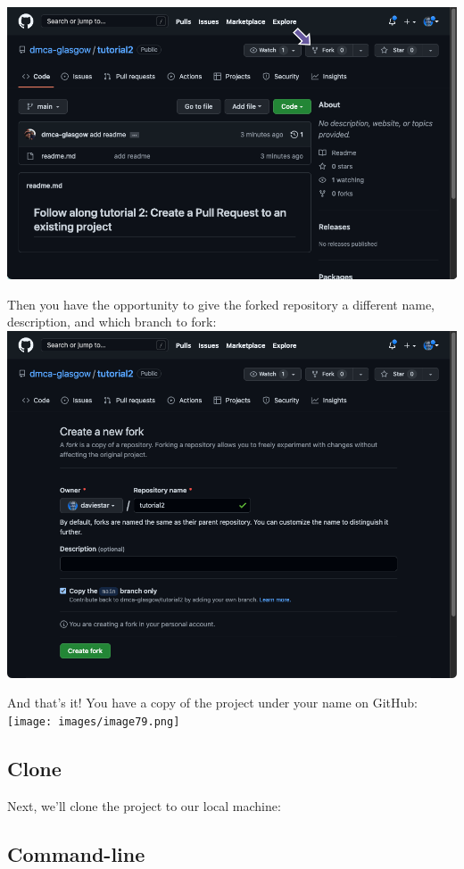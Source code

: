 \documentclass[
  letterpaper,
  DIV=11,
  numbers=noendperiod]{scrartcl}
\begin{document}
\includegraphics{images/image77.png}

Then you have the opportunity to give the forked repository a different
name, description, and which branch to fork:
\includegraphics{images/image78.png}

And that's it! You have a copy of the project under your name on GitHub:
\texttt{[image: images/image79.png]}

\hypertarget{clone-1}{%
\subsection{Clone}\label{clone-1}}

Next, we'll clone the project to our local machine:

\subsection{Command-line}
\end{document}
